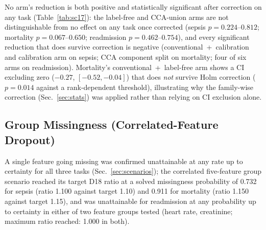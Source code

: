 \documentclass[apajournal,article,submit,oneauthor]{Definitions/mdpi}
\begin{document}
No arm's reduction is both positive and statistically significant after correction on any task (Table~\ref{tab:sc17}): the label-free and CCA-union arms are not distinguishable from no effect on any task once corrected (sepsis $p=0.224$--$0.812$; mortality $p=0.067$--$0.650$; readmission $p=0.462$--$0.754$), and every significant reduction that does survive correction is negative (conventional~+~calibration and calibration arm on sepsis; CCA component split on mortality; four of six arms on readmission). Mortality's conventional~+~label-free arm shows a CI excluding zero ($-0.27$, $[-0.52,-0.04]$) that does \emph{not} survive Holm correction ($p=0.014$ against a rank-dependent threshold), illustrating why the family-wise correction (Sec.~\ref{sec:stats}) was applied rather than relying on CI exclusion alone.

\subsection{Group Missingness (Correlated-Feature Dropout)}\label{sec:results-missingness}

A single feature going missing was confirmed unattainable at any rate up to certainty for all three tasks (Sec.~\ref{sec:scenarios}); the correlated five-feature group scenario reached its target D18 ratio at a solved missingness probability of 0.732 for sepsis (ratio 1.100 against target 1.10) and 0.911 for mortality (ratio 1.150 against target 1.15), and was unattainable for readmission at any probability up to certainty in either of two feature groups tested (heart rate, creatinine; maximum ratio reached: 1.000 in both).
\end{document}
